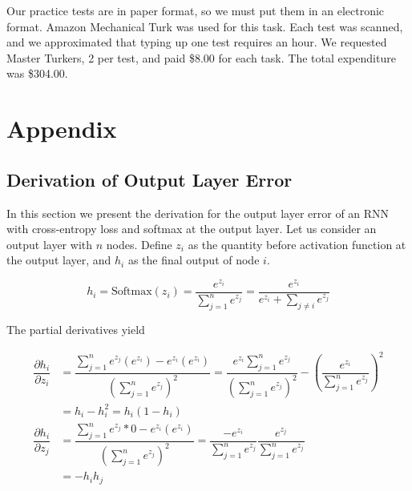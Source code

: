 \documentclass[pageno]{jpaper}
\begin{document}
Our practice tests are in paper format, so we must put them in an electronic
format. Amazon Mechanical Turk was used for this task. Each test was scanned,
and we approximated that typing up one test requires an hour. We requested
Master Turkers, 2 per test, and paid \$8.00 for each task. The total expenditure
was \$304.00.




\section{Appendix}
\label{Appendix}

\subsection{Derivation of Output Layer Error}
\label{Derivation of Output Layer Error}

In this section we present the derivation for the output layer error of an RNN
with cross-entropy loss and softmax at the output layer. Let us consider an
output layer with $n$ nodes. Define $z_i$ as the quantity before activation
function at the output layer, and $h_i$ as the final output of node $i$.

\begin{equation}
    \label{eq: output layer value}
    h_i = \text{Softmax}(z_i) = \dfrac{e^{z_i}}{\sum\limits_{j=1}^n e^{z_j}} = \dfrac{e^{z_i}}
    {e^{z_i} + \sum\limits_{j\neq i} e^{z_j}}
\end{equation}

The partial derivatives yield

\begin{equation}
    \label{eq: output partials}
    \begin{aligned}
        \dfrac{\partial h_i}{\partial z_i} &= \dfrac{\sum\limits_{j=1}^n e^{z_j}(e^{z_i}) - e^{z_i}(e^{z_i})}
        {\left( \sum\limits_{j=1}^n e^{z_j} \right)^2}
        = \dfrac{e^{z_i}\sum\limits_{j=1}^n e^{z_j}}{\left( \sum\limits_{j=1}^n e^{z_j} \right)^2}
        - \left( \dfrac{e^{z_i}}{ \sum\limits_{j=1}^n e^{z_j} } \right)^2 \\
        &= h_i - h_i^2
        = h_i\left( 1 - h_i \right) \\
        \dfrac{\partial h_i}{\partial z_j} &= \dfrac{\sum\limits_{j=1}^n e^{z_j}*0 - e^{z_i}(e^{z_i})}
        {\left( \sum\limits_{j=1}^n e^{z_j} \right)^2}
        = \dfrac{-e^{z_i}}{\sum\limits_{j=1}^n e^{z_j}}\dfrac{e^{z_j}}{\sum\limits_{j=1}^n e^{z_j}} \\
        &= -h_ih_j
    \end{aligned}
\end{equation}
\end{document}
